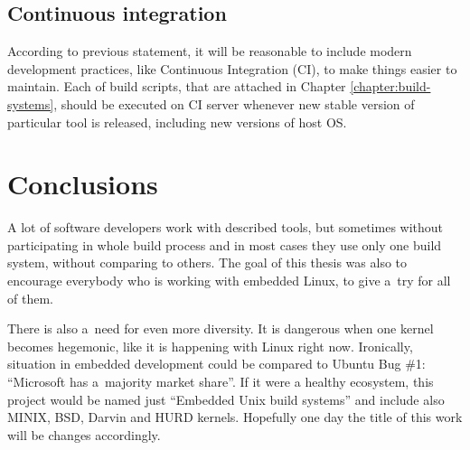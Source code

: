 \documentclass[printmode]{mgr}
\begin{document}
\subsection*{Continuous integration}
According to previous statement, it will be reasonable to include modern development practices, like Continuous Integration (CI), to make things easier to maintain.
Each of build scripts, that are attached in Chapter \ref{chapter:build-systems}, should be executed on CI server whenever new stable version of particular tool is released, including new versions of host OS.

\section{Conclusions}

A lot of software developers work with described tools, but sometimes without participating in whole build process and in most cases they use only one build system, without comparing to others.
The goal of this thesis was also to encourage everybody who is working with embedded Linux, to give a~try for all of them. 

There is also a~need for even more diversity. It is dangerous when one kernel becomes hegemonic, like it is happening with Linux right now. Ironically, situation in embedded development could be compared to Ubuntu Bug \#1: ``Microsoft has a~majority market share''.\cite{web:ubuntu-bug1} If it were a healthy ecosystem, this project would be named just ``Embedded Unix build systems'' and include also MINIX, BSD, Darvin and HURD kernels. Hopefully one day the title of this work will be changes accordingly.















\end{document}
